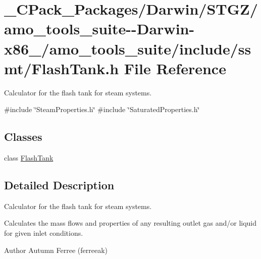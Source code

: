 \hypertarget{___c_pack___packages_2_darwin_2_s_t_g_z_2amo__tools__suite--_darwin-x86__64_2amo__tools__suite_2include_2ssmt_2_flash_tank_8h}{}\section{\+\_\+\+C\+Pack\+\_\+\+Packages/\+Darwin/\+S\+T\+G\+Z/amo\+\_\+tools\+\_\+suite-\/-\/\+Darwin-\/x86\+\_/amo\+\_\+tools\+\_\+suite/include/ssmt/\+Flash\+Tank.h File Reference}
\label{___c_pack___packages_2_darwin_2_s_t_g_z_2amo__tools__suite--_darwin-x86__64_2amo__tools__suite_2include_2ssmt_2_flash_tank_8h}


Calculator for the flash tank for steam systems.  


{\ttfamily \#include \char`\"{}Steam\+Properties.\+h\char`\"{}}\newline
{\ttfamily \#include \char`\"{}Saturated\+Properties.\+h\char`\"{}}\newline
\subsection*{Classes}
\begin{DoxyCompactItemize}
\item 
class \hyperlink{class_flash_tank}{Flash\+Tank}
\end{DoxyCompactItemize}


\subsection{Detailed Description}
Calculator for the flash tank for steam systems. 

Calculates the mass flows and properties of any resulting outlet gas and/or liquid for given inlet conditions.

\begin{DoxyAuthor}{Author}
Autumn Ferree (ferreeak) 
\end{DoxyAuthor}
